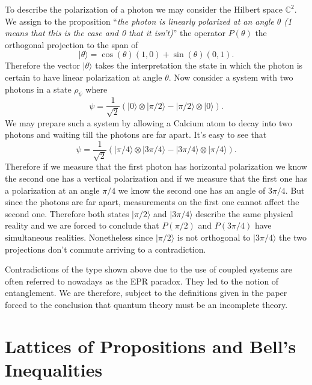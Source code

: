 \begin{example}\label{ex:Bell}
To describe the polarization of a photon we may consider the Hilbert space $\mathbb{C}^2$. We assign to the proposition ``\textit{the photon is linearly polarized at an angle $\theta$ (1 means that this is the case and 0 that it isn't)}'' the operator $P(\theta)$ the orthogonal projection to the span of 
\begin{equation}
|\theta\rangle=\cos(\theta)(1,0)+\sin(\theta)(0,1).
\end{equation}
Therefore the vector $|\theta\rangle$ takes the interpretation the state in which the photon is certain to have linear polarization at angle $\theta$. Now consider a system with two photons in a state $\rho_{\psi}$ where 
\begin{equation}
\psi=\frac{1}{\sqrt{2}}\left(|0\rangle\otimes|\pi/2\rangle-|\pi/2\rangle\otimes|0\rangle\right).
\end{equation}
We may prepare such a system by allowing a Calcium atom to decay into two photons and waiting till the photons are far apart. It's easy to see that 
\begin{equation}
\psi=\frac{1}{\sqrt{2}}\left(|\pi/4\rangle\otimes|3\pi/4\rangle-|3\pi/4\rangle\otimes|\pi/4\rangle\right).
\end{equation}
Therefore if we measure that the first photon has horizontal polarization we know the second one has a vertical polarization and if we measure that the first one has a polarization at an angle $\pi/4$ we know the second one has an angle of $3\pi/4$. But since the photons are far apart, measurements on the first one cannot affect the second one. Therefore both states $|\pi/2\rangle$ and $|3\pi/4\rangle$ describe the same physical reality and we are forced to conclude that $P(\pi/2)$ and $P(3\pi/4)$ have simultaneous realities. Nonetheless since $|\pi/2\rangle$ is not orthogonal to $|3\pi/4\rangle$ the two projections don't commute arriving to a contradiction. 
\end{example}

Contradictions of the type shown above due to the use of coupled systems are often referred to nowadays as the EPR paradox. They led to the notion of entanglement. We are therefore, subject to the definitions given in the paper \cite{Einstein1935} forced to the conclusion that quantum theory must be an incomplete theory.  

\section{Lattices of Propositions and Bell's Inequalities}

